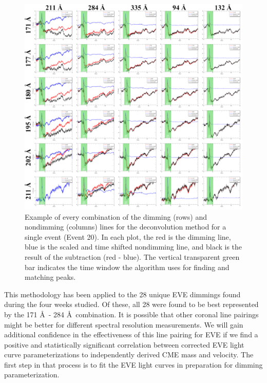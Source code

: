 \begin{figure}[!h]
    \begin{center}
	    \includegraphics[width=\textwidth]{Images/AllDeconvolutionsEvent20.png}
    \end{center}
    \caption[All deconvolution combinations example]{
        Example of every combination of the dimming (rows) and nondimming (columns) lines for the deconvolution method for 
        a single event (Event 20). In each plot, the red is the dimming line, blue is the scaled and time shifted 
        nondimming line, and black is the result of the subtraction (red - blue). The vertical transparent green bar 
        indicates the time window the algorithm uses for finding and matching peaks. 
   	}
    \label{fig:deconvolutioncombinations}
\end{figure}

This methodology has been applied to the 28 unique EVE dimmings found during the four weeks studied. Of these, all 28 were found to be best represented by the 171 \AA\ - 284 \AA\ combination. It is possible that other coronal line pairings might be better for different spectral resolution measurements. We will gain additional confidence in the effectiveness of this line pairing for EVE if we find a positive and statistically significant correlation between corrected EVE light curve parameterizations to independently derived CME mass and velocity. The first step in that process is to fit the EVE light curves in preparation for dimming parameterization. 


